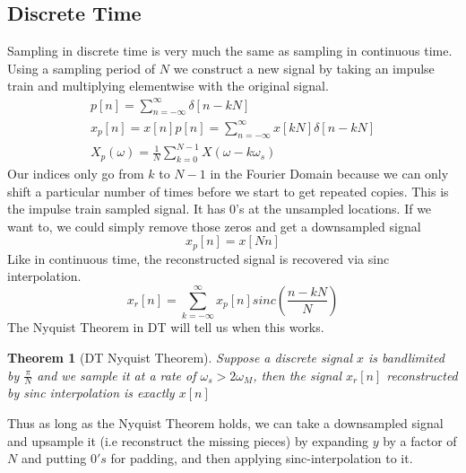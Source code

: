 \documentclass{article}
\newtheorem{theorem}{Theorem}
\begin{document}
\subsection{Discrete Time}
Sampling in discrete time is very much the same as sampling in continuous time. Using a sampling period of $N$
we construct a new signal by taking an impulse train and multiplying elementwise with the original signal.
\begin{align*}
    p[n]=\sum_{n=-\infty}^{\infty}{\delta[n-kN]}\\
    x_p[n] = x[n]p[n] = \sum_{n=-\infty}^{\infty}{x[kN]\delta[n-kN]}\\
    X_p(\omega) = \frac{1}{N}\sum_{k=0}^{N-1}{X(\omega-k\omega_s)}
\end{align*}
Our indices only go from $k$ to $N-1$ in the Fourier Domain because we can only shift a particular number of times
before we start to get repeated copies.
This is the impulse train sampled signal. It has 0's at the unsampled locations. If we want to, we could simply remove those zeros
and get a downsampled signal
$$x_p[n] = x[Nn]$$
Like in continuous time, the reconstructed signal is recovered via sinc interpolation.
$$x_r[n] = \sum_{k=-\infty}^{\infty}{x_p[n]sinc\left(\frac{n-kN}{N}\right)}$$
The Nyquist Theorem in DT will tell us when this works.
\begin{theorem}[DT Nyquist Theorem]
    Suppose a discrete signal $x$ is bandlimited by $\frac{\pi}{N}$ and we sample it at a rate of $\omega_s > 2\omega_M$, then the signal $x_r[n]$
    reconstructed by sinc interpolation is exactly $x[n]$
\end{theorem}
Thus as long as the Nyquist Theorem holds, we can take a downsampled signal and upsample it (i.e reconstruct the missing pieces) by expanding $y$ by a factor
of $N$ and putting $0's$ for padding, and then applying sinc-interpolation to it.
\end{document}
